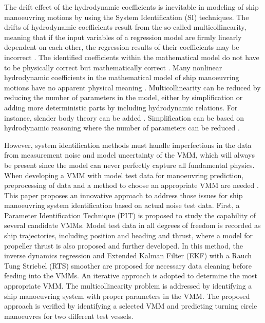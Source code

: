 \documentclass[review]{elsarticle}
\begin{document}
% 
The drift effect of the hydrodynamic coefficients is inevitable in modeling of ship manoeuvring motions by using the System Identification (SI) techniques. The drifts of hydrodynamic coefficients result from the so-called multicollinearity, meaning that if the input variables of a regression model are firmly linearly dependent on each other, the regression results of their coefficients may be incorrect \cite{luo_parameter_2016}. The identified coefficients within the mathematical model do not have to be physically correct but mathematically correct \cite{ittc_maneuvering_2008}. Many nonlinear hydrodynamic coefficients in the mathematical model of ship manoeuvring motions have no apparent physical meaning \cite{luo_parameter_2016}. Multicollinearity can be reduced by reducing the number of parameters in the model, either by simplification or adding more deterministic parts by including hydrodynamic relations. For instance, slender body theory can be added \cite{hwang_cancellation_1982}. Simplification can be based on hydrodynamic reasoning where the number of parameters can be reduced \cite{luo_parameter_2016}.

 
However, system identification methods must handle imperfections in the data from measurement noise and model uncertainty of the VMM, which will always be present since the model can never perfectly capture all fundamental physics. When developing a VMM with model test data for manoeuvring prediction, preprocessing of data and a method to choose an appropriate VMM are needed \cite{alexandersson_comparison_2022}.
This paper proposes an innovative approach to address those issues for ship manoeuvring system identification based on actual noise test data. First, a Parameter Identification Technique (PIT) is proposed to study the capability of several candidate VMMs. Model test data in all degrees of freedom is recorded as ship trajectories, including position and heading and thrust, where a model for propeller thrust is also proposed and further developed. In this method, the inverse dynamics regression and Extended Kalman Filter (EKF) with a Rauch Tung Striebel (RTS) smoother \cite{rauch_maximum_1965} are proposed for necessary data cleaning before feeding into the VMMs. An iterative approach is adopted to determine the most appropriate VMM. The multicollinearity problem is addressed by identifying a ship manoeuvring system with proper parameters in the VMM. The proposed approach is verified by identifying a selected VMM and predicting turning circle manoeuvres for two different test vessels.
\end{document}
